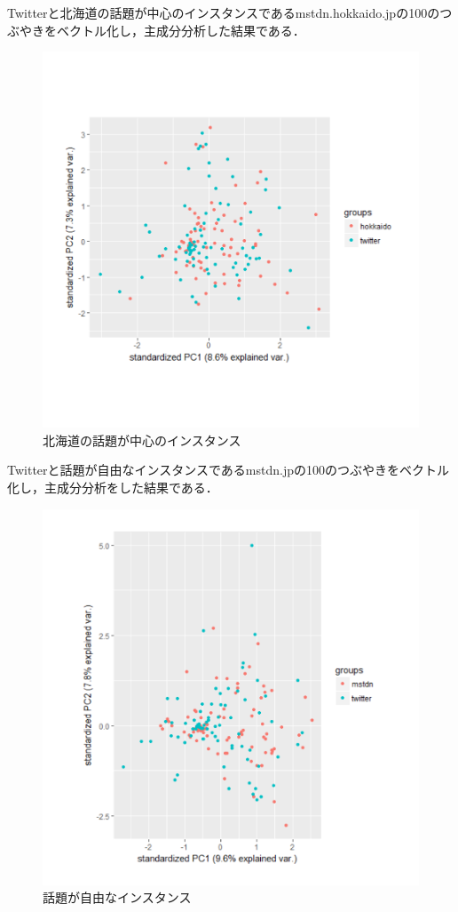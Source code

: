 Twitterと北海道の話題が中心のインスタンスであるmstdn.hokkaido.jpの100のつぶやきをベクトル化し，主成分分析した結果である．
\begin{figure}[h]
\centering
\includegraphics[width=13cm,clip]{hokkaido.pdf}
\caption{北海道の話題が中心のインスタンス}\label{hokkaido}
\end{figure}
\newpage

Twitterと話題が自由なインスタンスであるmstdn.jpの100のつぶやきをベクトル化し，主成分分析をした結果である．
\begin{figure}[h]
\centering
\includegraphics[width=13cm,clip]{mstdn.pdf}
\caption{話題が自由なインスタンス}\label{mstdn}
\end{figure}
\newpage

